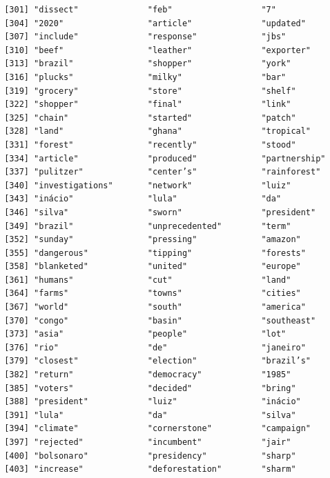 \documentclass[
  letterpaper,
  DIV=11,
  numbers=noendperiod]{scrartcl}
\begin{document}
\begin{verbatim}
 [301] "dissect"              "feb"                  "7"                   
 [304] "2020"                 "article"              "updated"             
 [307] "include"              "response"             "jbs"                 
 [310] "beef"                 "leather"              "exporter"            
 [313] "brazil"               "shopper"              "york"                
 [316] "plucks"               "milky"                "bar"                 
 [319] "grocery"              "store"                "shelf"               
 [322] "shopper"              "final"                "link"                
 [325] "chain"                "started"              "patch"               
 [328] "land"                 "ghana"                "tropical"            
 [331] "forest"               "recently"             "stood"               
 [334] "article"              "produced"             "partnership"         
 [337] "pulitzer"             "center’s"             "rainforest"          
 [340] "investigations"       "network"              "luiz"                
 [343] "inácio"               "lula"                 "da"                  
 [346] "silva"                "sworn"                "president"           
 [349] "brazil"               "unprecedented"        "term"                
 [352] "sunday"               "pressing"             "amazon"              
 [355] "dangerous"            "tipping"              "forests"             
 [358] "blanketed"            "united"               "europe"              
 [361] "humans"               "cut"                  "land"                
 [364] "farms"                "towns"                "cities"              
 [367] "world"                "south"                "america"             
 [370] "congo"                "basin"                "southeast"           
 [373] "asia"                 "people"               "lot"                 
 [376] "rio"                  "de"                   "janeiro"             
 [379] "closest"              "election"             "brazil’s"            
 [382] "return"               "democracy"            "1985"                
 [385] "voters"               "decided"              "bring"               
 [388] "president"            "luiz"                 "inácio"              
 [391] "lula"                 "da"                   "silva"               
 [394] "climate"              "cornerstone"          "campaign"            
 [397] "rejected"             "incumbent"            "jair"                
 [400] "bolsonaro"            "presidency"           "sharp"               
 [403] "increase"             "deforestation"        "sharm"               

\end{verbatim}
\end{document}
